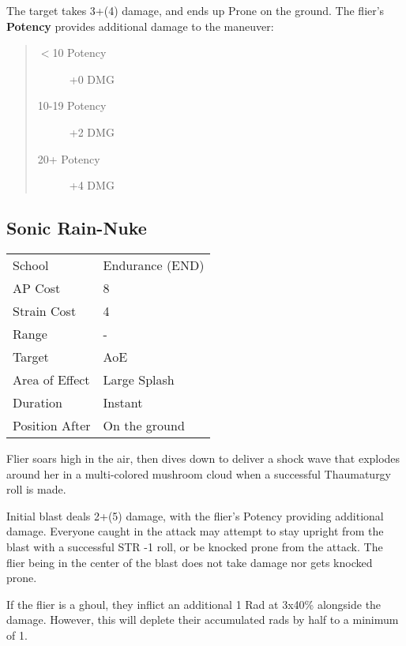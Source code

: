 \documentclass[11pt,a4paper,twocolumn]{book}
\begin{document}
The target takes 3+(4) damage, and ends up Prone on the ground. The flier's \textbf{Potency} provides additional damage to the maneuver: 

\begin{quote}
	\begin{description}
		\item[$<$10 Potency] 	+0 DMG
		\item[10-19 Potency] 	+2 DMG
		\item[20+ Potency] 	+4 DMG
	\end{description}
\end{quote}


\vfill

\subsection*{Sonic Rain-Nuke}
{
	\begin{tabu} to 75mm{| X[l,4] | X[l,7] |}
		\hline
		School 			& Endurance (END) 	\\
		AP Cost	      	& 8 				\\
		Strain Cost     & 4 				\\
		Range     		& -				\\
		Target      	& AoE 				\\
		Area of Effect  & Large Splash 	 	\\
		Duration     	& Instant 	 		\\
		Position After  & On the ground 	\\ \hline
	\end{tabu}
	
}

\medskip

Flier soars high in the air, then dives down to deliver a shock wave that explodes around her in a multi-colored mushroom cloud when a successful Thaumaturgy roll is made.

Initial blast deals 2+(5) damage, with the flier's Potency providing additional damage. Everyone caught in the attack may attempt to stay upright from the blast with a successful STR -1 roll, or be knocked prone from the attack. The flier being in the center of the blast does not take damage nor gets knocked prone.

If the flier is a ghoul, they inflict an additional 1 Rad at 3x40\% alongside the damage. However, this will deplete their accumulated rads by half to a minimum of 1.
\end{document}
